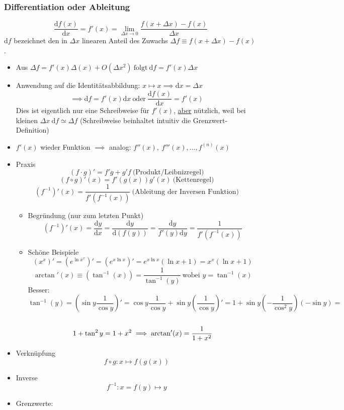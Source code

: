 \documentclass[a4paper]{scrartcl}
\theoremstyle{definition}
\theoremstyle{plain}
\theoremstyle{remark}
\theoremstyle{remark}
\begin{document}
\subsubsection{Differentiation oder Ableitung}
\label{sec-2-2-2}
\[\frac{\mathrm{d}f(x)}{\mathrm{d}x} = f'(x) = \lim_{\Delta x \to 0} \frac{f(x + \Delta x) - f(x)}{\Delta x}\]
$\mathrm{d}f$ bezeichnet den in $\Delta x$ linearen Anteil des Zuwachs $\Delta f\equiv f(x + \Delta x) - f(x)$.
\begin{itemize}
\item Aus $\Delta f = f'(x)\Delta(x) + O(\Delta x^2)~\text{folgt}~\mathrm{d}f = f'(x)\Delta x$
\item Anwendung auf die Identitätsabbildung: $x \mapsto x \implies \mathrm{d}x = \Delta x$
      \[\implies \mathrm{d}f = f'(x)\mathrm{d}x~\text{oder}~\frac{\mathrm{d}f(x)}{\mathrm{d}x} = f'(x)\]
      Dies ist eigentlich nur eine Schreibweise für $f'(x)$, \uline{aber} nützlich, weil bei kleinen $\Delta x~\mathrm{d}f \simeq \Delta f$ (Schreibweise beinhaltet intuitiv die Grenzwert-Definition)
\item $f'(x)$ wieder Funktion $\implies$ analog: $f''(x),~f'''(x),\ldots,f^{(n)}(x)$
\item Praxis
\[(f\cdot g)' = f' g + g' f~\text{(Produkt/Leibnizregel)}\]
\[(f \circ g)'(x) = f'(g(x))g'(x)~\text{(Kettenregel)}\]
\[(f^{-1})'(x) = \frac{1}{f'(f^{-1}(x))}~\text{(Ableitung der Inversen Funktion)}\]
\begin{itemize}
\item Begründung (nur zum letzten Punkt)
\[(f^{-1})'(x) = \frac{\mathrm{d}y}{\mathrm{d}x} = \frac{\mathrm{d}y}{\mathrm{d}(f(y))} = \frac{\mathrm{d}y}{f'(y)\mathrm{d}y} = \frac{1}{f'(f^{-1}(x))}\]
\item Schöne Beispiele
\[(x^x)' = (e^{\ln{x^x}})' = (e^{x\ln{x}})' = e^{x\ln{x}}(\ln{x} + 1) = x^x(\ln{x} + 1)\]
\[\arctan'(x) \equiv (\tan^{-1}(x)) = \frac{1}{\tan^{-1}(y)}~\text{wobei $y = \tan^{-1}(x)$}\]
Besser: \[\tan^{-1}(y) = (\sin{y} \frac{1}{\cos{y}})' = \cos{y} \frac{1}{\cos{y}} + \sin{y}(\frac{1}{\cos{y}})' = 1 + \sin{y}(-\frac{1}{\cos^2{y}})(-\sin{y}) = \] \\
        \[ 1 + \tan^2{y} = 1 + x^2 \\ \implies \arctan'(x) = \frac{1}{1 + x^2}\]
\end{itemize}
\item Verknüpfung \[f\circ g: x\mapsto f(g(x))\]
\item Inverse \[f^{-1} : x=f(y)\mapsto y\]
\item Grenzwerte:

\end{itemize}
\end{document}
